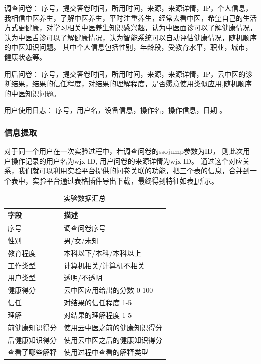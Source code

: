 调查问卷： 序号，提交答卷时间，所用时间，来源，来源详情，IP，个人信息，我相信中医养生，了解中医养生，平时注重养生，经常去看中医，希望自己的生活方式更健康，对学习相关中医养生知识感兴趣，认为中医面诊可以了解健康情况，认为中医舌诊可以了解健康情况，认为智能系统可以自动评估健康情况，随机顺序的中医知识问题。
其中个人信息包括性别，年龄段，受教育水平，职业，城市，健康状态等。

用后问卷： 序号，提交答卷时间，所用时间，来源，来源详情，IP，云中医的诊断结果，结果的信任程度，对结果的理解程度，是否愿意使用类似应用,随机顺序的中医知识问题。

用户使用日志： 序号，用户名，设备信息，操作名，操作信息，日期 。

\subsubsection{信息提取}
对于同一个用户在一次实验过程中，若调查问卷的ssojump参数为ID， 则此次用户操作记录的用户名为wjx-ID, 用户问卷的来源详情为wjx-ID。 
通过这个对应关系，我们就可以利用实验平台提供的问卷关联的功能，把三个表的信息，合并到一个表中，实验平台通过表格插件导出下载，最终得到特征如表\ref{tab:exp_data}所示。


\begin{table}[h]
    \centering
    \begin{tabular}{ll}
        \toprule
        字段 & 描述 \\ 
        \midrule
        序号 & 调查问卷序号 \\
        性别 & 男/女/未知 \\
        教育程度 & 本科以下/本科/本科以上 \\
        工作类型 & 计算机相关/计算机不相关 \\
        用户类型 & 透明/不透明 \\
        健康得分 & 云中医应用给出的分数 0-100 \\
        信任 & 对结果的信任程度 1-5 \\
        理解 & 对结果的理解程度 1-5 \\
        前健康知识得分 & 使用云中医之前的健康知识得分 \\
        后健康知识得分 & 使用云中医之后的健康知识得分 \\
        查看了哪些解释 & 使用过程中查看的解释类型 \\
        \bottomrule
    \end{tabular}
    \caption{实验数据汇总}
    \label{tab:exp_data}
\end{table}

